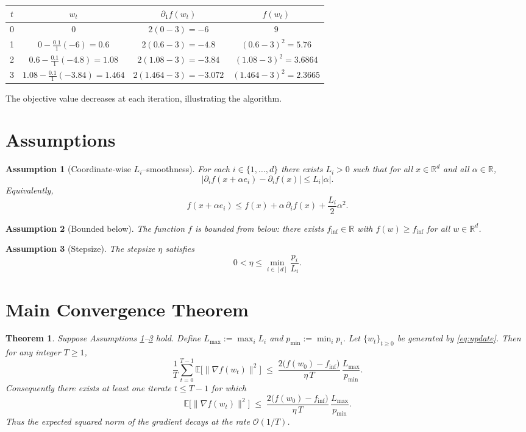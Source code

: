 \documentclass{article}
\newtheorem{theorem}{Theorem}
\newtheorem{assumption}{Assumption}
\newcommand{\E}{\mathbb{E}}
\newcommand{\R}{\mathbb{R}}
\begin{document}
\begin{center}
\begin{tabular}{c|c|c|c}
$t$ & $w_t$ & $\partial_1 f(w_t)$ & $f(w_t)$\\\hline
0 & $0$ & $2(0-3)=-6$ & $9$\\
1 & $0-\frac{0.1}{1}(-6)=0.6$ & $2(0.6-3)=-4.8$ & $(0.6-3)^2=5.76$\\
2 & $0.6-\frac{0.1}{1}(-4.8)=1.08$ & $2(1.08-3)=-3.84$ & $(1.08-3)^2=3.6864$\\
3 & $1.08-\frac{0.1}{1}(-3.84)=1.464$ & $2(1.464-3)=-3.072$ & $(1.464-3)^2=2.3665$\\
\end{tabular}
\end{center}
The objective value decreases at each iteration, illustrating the algorithm.

\newpage
\section*{Assumptions}
\begin{assumption}[Coordinate‑wise $L_i$–smoothness]\label{as:smooth}
For each $i\in\{1,\dots,d\}$ there exists $L_i>0$ such that for all $x\in\R^{d}$ and all $\alpha\in\R$,
\[
\bigl|\partial_i f(x+\alpha e_i)-\partial_i f(x)\bigr|\le L_i |\alpha|.
\]
Equivalently,
\[
f(x+\alpha e_i)\le f(x)+\alpha\,\partial_i f(x)+\frac{L_i}{2}\alpha^{2}.
\]
\end{assumption}

\begin{assumption}[Bounded below]\label{as:lower}
The function $f$ is bounded from below: there exists $f_{\inf}\in\R$ with
$f(w)\ge f_{\inf}$ for all $w\in\R^{d}$.
\end{assumption}

\begin{assumption}[Stepsize]\label{as:stepsize}
The stepsize $\eta$ satisfies
\[
0<\eta\le \min_{i\in[d]}\frac{p_i}{L_i}.
\]
\end{assumption}

\section*{Main Convergence Theorem}
\begin{theorem}\label{thm:main}
Suppose Assumptions \ref{as:smooth}--\ref{as:stepsize} hold.
Define $L_{\max}:=\max_{i}L_i$ and $p_{\min}:=\min_{i}p_i$.
Let $\{w_t\}_{t\ge0}$ be generated by \eqref{eq:update}. Then for any integer $T\ge1$,
\[
\frac{1}{T}\sum_{t=0}^{T-1}\E\!\bigl[\|\nabla f(w_t)\|^{2}\bigr]
   \;\le\;
   \frac{2\bigl(f(w_0)-f_{\inf}\bigr)}{\eta\,T}\,
   \frac{L_{\max}}{p_{\min}} .
\]
Consequently there exists at least one iterate $t\le T-1$ for which
\[
\E\!\bigl[\|\nabla f(w_t)\|^{2}\bigr]
   \;\le\;
   \frac{2\bigl(f(w_0)-f_{\inf}\bigr)}{\eta\,T}\,
   \frac{L_{\max}}{p_{\min}} .
\]
Thus the expected squared norm of the gradient decays at the rate $\mathcal O(1/T)$.
\end{theorem}
\end{document}
